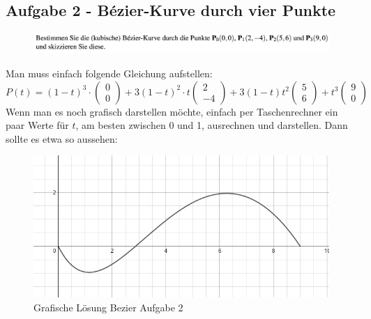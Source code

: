 \subsection{Aufgabe 2 - Bézier-Kurve durch vier Punkte}
\begin{figure}[!ht]
	\centering
	\includegraphics[width=1.0\linewidth]{fig/ueb_curves_2}
\end{figure}
Man muss einfach folgende Gleichung aufstellen:
\begin{displaymath}
P\left( t\right) = \left( 1-t\right)^3 \cdot \begin{pmatrix}0 \\ 0\end{pmatrix} + 3\left( 1-t\right)^2\cdot t \begin{pmatrix}2 \\ -4\end{pmatrix} + 3\left( 1-t\right)t^2\begin{pmatrix}5 \\ 6\end{pmatrix} + t^3\begin{pmatrix}9 \\ 0\end{pmatrix}
\end{displaymath}
Wenn man es noch grafisch darstellen möchte, einfach per Taschenrechner ein paar Werte für \(t\), am besten zwischen 0 und 1, ausrechnen und darstellen. Dann sollte es etwa so aussehen:
\begin{figure}[!ht]
	\centering
	\includegraphics[width=0.5\linewidth]{fig/bezier_aufgabe2}
	\caption{Grafische Lösung Bezier Aufgabe 2}
	\label{fig:bezier_aufgabe2}
\end{figure}

